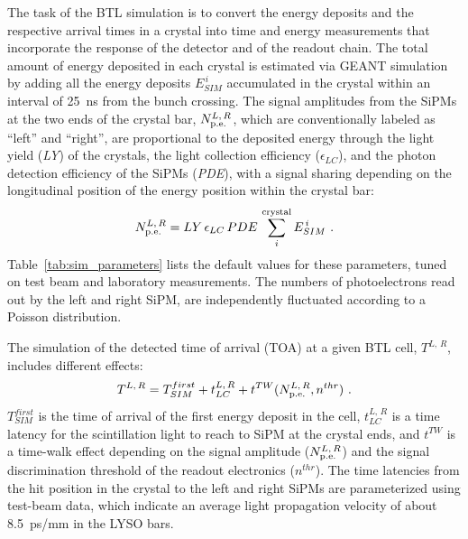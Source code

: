 The task of the BTL simulation is to convert the energy deposits and the 
respective arrival times in a crystal into time and energy measurements 
that incorporate the response of the detector and of the readout chain. 
The total amount of energy deposited in each crystal is estimated via
GEANT simulation by adding all the energy deposits $E_{SIM}^{\,i}$ 
accumulated in the crystal within an interval of 25~ns from the bunch crossing. 
The signal amplitudes from the SiPMs at the two ends of the crystal bar,
$N_{\rm p.e.}^{L,\,R}$, which are conventionally labeled as ``left'' and
``right'', are proportional to the deposited energy through the light yield
({\it LY}) of the crystals, the light collection efficiency ($\epsilon_{LC}$),
and the photon detection efficiency of the SiPMs ({\it PDE}), with a signal
sharing depending on the longitudinal position of the energy position 
within the crystal bar:
\begin{equation}
N_{\rm p.e.}^{L,\,R} = LY\, \epsilon_{LC}\, PDE\, \sum_{i}^{\rm crystal} E_{SIM}^{\,i} \ .
\end{equation}
Table~\ref{tab:sim_parameters} lists the default values for these
parameters, tuned on test beam and laboratory measurements. 
The numbers of photoelectrons read out by the left and right SiPM, 
are independently fluctuated according to a Poisson distribution. 

The simulation of the detected time of arrival (TOA) at a given BTL cell, 
$T^{L,\,R}$, includes different effects: 
\begin{equation}
T^{L,\,R} = T_{SIM}^{first} + t^{L,\,R}_{LC} + t^{TW}(N_{\rm p.e.}^{L,\,R},n^{thr})\ .
\end{equation}
$T_{SIM}^{first}$ is the time of arrival of the first energy deposit in the cell, 
$t^{L,\,R}_{LC}$ is a time latency for the scintillation light to reach to SiPM at
the crystal ends, and $t^{TW}$ is a time-walk effect depending on the signal 
amplitude ($N_{\rm p.e.}^{L,\,R}$) and the signal discrimination threshold 
of the readout electronics ($n^{thr}$). 
The time latencies from the hit position in the crystal to the left and right 
SiPMs are parameterized using test-beam data, which indicate an average light 
propagation velocity of about 8.5~ps/mm in the LYSO bars.  

